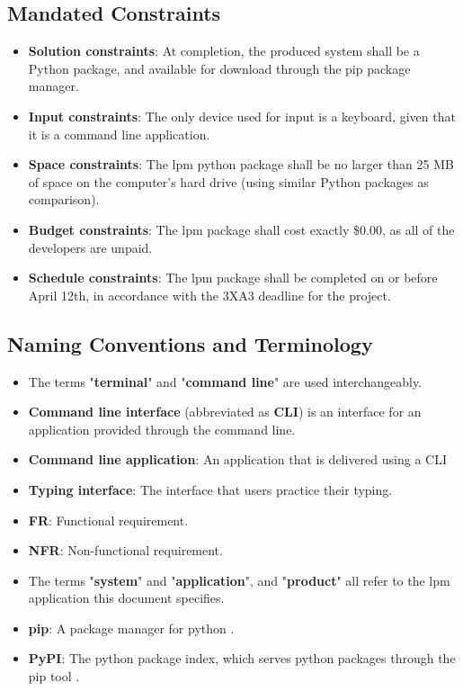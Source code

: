 \documentclass[12pt, titlepage]{article}
\begin{document}
\subsection{Mandated Constraints}
\begin{itemize}
    \item \textbf{Solution constraints}: At completion, the produced system shall be a Python package, and available for download through the pip package manager.
    \item \textbf{Input constraints}: The only device used for input is a keyboard, given that it is a command line application.
    \item \textbf{Space constraints}: The lpm python package shall be no larger than 25 MB of space on the computer's hard drive (using similar Python packages as comparison).
    \item \textbf{Budget constraints}: The lpm package shall cost exactly \$0.00, as all of the developers are unpaid.
    \item \textbf{Schedule constraints}: The lpm package shall be completed on or before April 12th, in accordance with the 3XA3 deadline for the project.
\end{itemize}
\subsection{Naming Conventions and Terminology}
\begin{itemize}
    \item The terms "\textbf{terminal}" and "\textbf{command line}" are used interchangeably.
    \item \textbf{Command line interface} (abbreviated as \textbf{CLI}) is an interface for an application provided through the command line.
    \item \textbf{Command line application}: An application that is delivered using a CLI
    \item \textbf{Typing interface}: The interface that users practice their typing.
    \item \textbf{FR}: Functional requirement.
    \item \textbf{NFR}: Non-functional requirement.
    \item The terms "\textbf{system}" and "\textbf{application}", and "\textbf{product}" all refer to the lpm application this document specifies.
    \item \textbf{pip}: A package manager for python \citep{pip}.
    \item \textbf{PyPI}: The python package index, which serves python packages through the pip tool \citep{pypi}.
\end{itemize}
\end{document}
